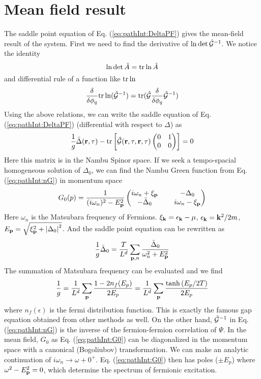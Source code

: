 \section{Mean field result\label{sec:pathInt:meanfield}}
The saddle point equation of Eq. (\ref{eq:pathInt:DeltaPF}) gives the mean-field result of the system.  First we need to find the derivative of $\ln\det\hat{\mathcal{G}}^{-1}$.  We notice the identity
\begin{equation}
\ln\det\hat{A}=\text{tr}\ln\hat{A}
\end{equation}
and differential rule of a function like $\text{tr}\ln$
\begin{equation}\label{eq:pathInt:diffTr}
\frac{\delta}{\delta\phi_q}\text{tr}\ln(\hat{\mathcal{G}}^{-1})=\text{tr}(\hat{\mathcal{G}}\frac{\delta}{\delta\phi_q}\hat{\mathcal{G}}^{-1})
\end{equation}
Using the above relations, we can write the saddle equation of Eq. (\ref{eq:pathInt:DeltaPF}) (differential with respect to $\Delta$) as
\begin{equation}
\frac{1}{g}\bar{\Delta}(\mathbf{r},\tau)-\text{tr}\left[\hat{\mathcal{G}}(\mathbf{r},\tau,\mathbf{r},\tau)\begin{pmatrix}0&1\\0&0\end{pmatrix}\right]=0
\end{equation}
Here this matrix is in the Nambu Spinor space.  If we seek a tempo-spacial homogeneous solution of $\Delta_0$, we can find the Nambu Green function from Eq. (\ref{eq:pathInt:nG}) in momentum space
\begin{equation}\label{eq:pathInt:G0}
G_0(p)=\frac{1}{(i\omega_n)^2-E_{\mathbf{p}}^2}
\begin{pmatrix}
	i\omega_n+\xi_{\mathbf{p}}&\;&-\Delta_0\\
	-\bar{\Delta}_0&\;&i\omega_n-\xi_{\mathbf{p}}
\end{pmatrix}
\end{equation}
Here $\omega_n$ is the Matsubara frequency of Fermions.  $\xi_{\mathbf{k}}=\epsilon_{\mathbf{k}}-\mu$, $\epsilon_{\mathbf{k}}=\mathbf{k}^{2}/2m$,  $E_{\mathbf{p}}=\sqrt{\xi_{\mathbf{p}}^2+\left\lvert{\Delta_0}\right\rvert^2}$.  And the saddle point equation can be rewritten as 
\begin{equation}
\frac{1}{g}\bar{\Delta}_0=\frac{T}{L^d}\sum_{\mathbf{p},n}\frac{\bar\Delta_0}{\omega_n^2+E_{\mathbf{p}}^2}
\end{equation}
The summation of Matsubara frequency can be evaluated and we find 
\begin{equation}
\frac{1}{g}=\frac{1}{L^d}\sum_{\mathbf{p}}\frac{1-2n_f(E_p)}{2E_p}=\frac{1}{L^d}\sum_{\mathbf{p}}\frac{\tanh{(E_p/2T)}}{2E_p}
\label{eq:pathInt:gap}
\end{equation}
where $n_f(\epsilon)$ is the fermi distribution function.  This is exactly the famous gap equation obtained from other methods as well.  On the other hand, $\hat{\mathcal{G}}^{-1}$ in Eq. (\ref{eq:pathInt:nG})  is the inverse of the  fermion-fermion correlation of $\Psi$.  In the mean field, $G_{0}$ as Eq. (\ref{eq:pathInt:G0}) can be diagonalized in the momentum space with a canonical (Bogoliubov) transformation.  We can make an analytic continuation of $i\omega_{n}\rightarrow\omega+0^{+}$.  Eq. (\ref{eq:pathInt:G0})  then has poles ($\pm{}E_{p}$) where  $\omega^2-E_{\mathbf{p}}^2=0$,  which determine  the spectrum of fermionic excitation.  


